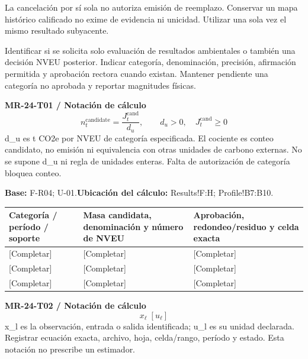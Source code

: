 La cancelación por sí sola no autoriza emisión de reemplazo. Conservar un mapa histórico calificado no exime de evidencia ni unicidad. Utilizar una sola vez el mismo resultado subyacente.\par
{}
Identificar si se solicita solo evaluación de resultados ambientales o también una decisión NVEU posterior. Indicar categoría, denominación, precisión, afirmación permitida y aprobación rectora cuando existan. Mantener pendiente una categoría no aprobada y reportar magnitudes físicas.\par
{}
\par\begingroup\sffamily\fontsize{8.4}{10.5}\selectfont\color{NEBGreen}
\textbf{MR-24-T01 / Notación de cálculo}\
{\fontsize{10}{12}\selectfont\[n_t^{\mathrm{candidate}}=\frac{J_t^{\mathrm{cand}}}{d_u},\qquad d_u>0,\quad J_t^{\mathrm{cand}}\ge0\]}
d\_u es t CO2e por NVEU de categoría especificada. El cociente es conteo candidato, no emisión ni equivalencia con otras unidades de carbono externas. No se supone d\_u ni regla de unidades enteras. Falta de autorización de categoría bloquea conteo.\par
\textbf{Base:} F-R04; U-01.\quad\textbf{Ubicación del cálculo:} Results!F:H; Profile!B7:B10.\par\endgroup
{\sffamily\fontsize{8.6}{10.7}\selectfont\begin{longtable}{@{}P{48mm}P{61mm}P{53mm}@{}}
\toprule
\textbf{Categoría / período / soporte} & \textbf{Masa candidata, denominación y número de NVEU} & \textbf{Aprobación, redondeo/residuo y celda exacta}\\\midrule\endhead
\rule{0pt}{8mm}[Completar] & [Completar] & [Completar]\\\hline
\rule{0pt}{8mm}[Completar] & [Completar] & [Completar]\\\hline
\rule{0pt}{8mm}[Completar] & [Completar] & [Completar]\\\hline
\end{longtable}}
\par\begingroup\sffamily\fontsize{8.4}{10.5}\selectfont\color{NEBGreen}
\textbf{MR-24-T02 / Notación de cálculo}\
{\fontsize{10}{12}\selectfont\[x_{\ell}\;[u_{\ell}]\]}
x\_l es la observación, entrada o salida identificada; u\_l es su unidad declarada. Registrar ecuación exacta, archivo, hoja, celda/rango, período y estado. Esta notación no prescribe un estimador.\par
